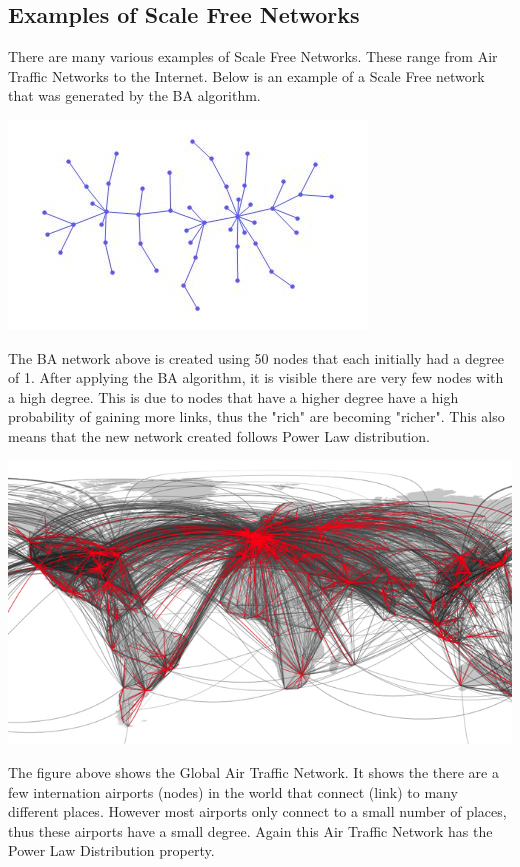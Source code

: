 \documentclass[a0,final]{a0poster}
\begin{document}
\begin{multicols}{3}
\columnbreak

\section*{Examples of Scale Free Networks}

There are many various examples of Scale Free Networks. These range from Air Traffic Networks to the Internet. Below is an example of a Scale Free network that was generated by the BA algorithm.
\newline
{\centering
\centerline{\includegraphics[scale=1.5]{BA.jpg}}}
\newline
The BA network above is created using 50 nodes that each initially had a degree of 1.
After applying the BA algorithm, it is visible there are very few nodes with a high degree. This is due to nodes that have a higher degree have a high probability of gaining more links, thus the "rich" are becoming "richer". This also means that the new network created follows Power Law distribution.
\newline

\centerline{\includegraphics{airtraffic.jpg}}

The figure above shows the Global Air Traffic Network. It shows the there are a few internation airports (nodes) in the world that connect (link) to many different places. However most airports only connect to a small number of places, thus these airports have a small degree. Again this Air Traffic Network has the Power Law Distribution property.


\end{multicols}
\end{document}
